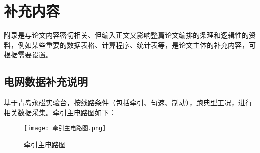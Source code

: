 \chapter{补充内容}

附录是与论文内容密切相关、但编入正文又影响整篇论文编排的条理和逻辑性的资料，例如某些重要的数据表格、计算程序、统计表等，是论文主体的补充内容，可根据需要设置。

\section{电网数据补充说明}
基于青岛永磁实验台，按线路条件（包括牵引、匀速、制动），跑典型工况，进行相关数据采集。牵引主电路图如下：
\begin{figure}
  \centering
  \texttt{[image: 牵引主电路图.png]}
  \caption{牵引主电路图}
  \label{fig:qianyin}
\end{figure}
